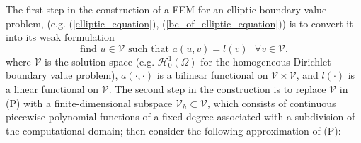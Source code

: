 The first step in the construction of a FEM for an elliptic boundary value problem, (e.g. (\ref{elliptic_equation}), (\ref{bc_of_elliptic_equation})) is to convert it into its weak formulation
\begin{equation*}
	\text{find } u \in \mathscr{V}\text{ such that }a(u, v) = l(v)\text{ }\forall v \in \mathscr{V}.  \tag{P}
\end{equation*}
where $\mathscr{V}$ is the solution space (e.g. $\mathscr{H}_{0}^{1}(\Omega)$ for the homogeneous Dirichlet boundary value problem), $a(\cdot, \cdot)$ is a bilinear functional on $\mathscr{V}\times\mathscr{V}$, and $l(\cdot)$ is a linear functional on $\mathscr{V}$.
The second step in the construction is to replace $\mathscr{V}$ in (P) with a finite-dimensional subspace $\mathscr{V}_h \subset \mathscr{V}$, which consists of continuous piecewise polynomial functions of a fixed degree associated with a subdivision of the computational domain; then consider the following approximation of (P):
